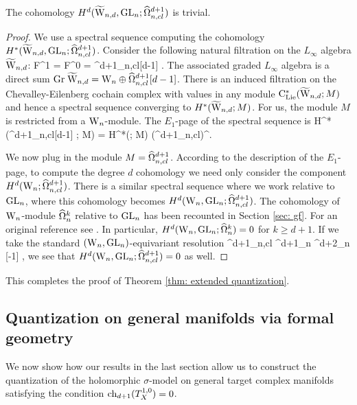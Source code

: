 \begin{lem}
The cohomology $H^{d}(\widetilde{\rm W}_{n,d} , {\rm GL}_n ; \widehat{\Omega}^{d+1}_{n,cl})$ is trivial.
\end{lem}
\begin{proof}
We use a spectral sequence computing the cohomology $H^{*}(\widetilde{\rm W}_{n,d} , {\rm GL}_n ; \widehat{\Omega}^{d+1}_{n,cl})$.
Consider the following natural filtration on the $L_\infty$ algebra $\widetilde{\rm W}_{n,d}$:
\ben
F^1 = \TVectd \supset F^0 = \hOmega^{d+1}_{n,cl}[d-1] .
\een
The associated graded $L_\infty$ algebra is a direct sum ${\rm Gr} \; \widetilde{\rm W}_{n,d} = {{\rm W}_n} \oplus \widehat{\Omega}^{d+1}_{n,cl}[d-1]$. 
There is an induced filtration on the Chevalley-Eilenberg cochain complex with values in any module ${\rm C}_{{\rm Lie}}^*(\widetilde{\rm W}_{n,d} ; M)$ and hence a spectral sequence converging to $H^*(\widetilde{\rm W}_{n,d} ; M)$. 
For us, the module $M$ is restricted from a ${{\rm W}_n}$-module. 
The $E_1$-page of the spectral sequence is 
\ben
H^*(\Vect \oplus \hOmega^{d+1}_{n,cl}[d-1] ; M) = H^*(\Vect ; M) \tensor \Sym \left(\hOmega^{d+1}_{n,cl}\right)^\vee [-d] .
\een

We now plug in the module $M = \widehat{\Omega}^{d+1}_{n,cl}$. 
According to the description of the $E_1$-page, to compute the degree $d$ cohomology we need only consider the component $H^d({{\rm W}_n} ; \widehat{\Omega}^{d+1}_{n,cl})$.
There is a similar spectral sequence where we work relative to ${\rm GL}_n$, where this cohomology becomes $H^d({{\rm W}_n} , {\rm GL}_n; \widehat{\Omega}^{d+1}_{n,cl})$.
The cohomology of ${{\rm W}_n}$-module $\widehat{\Omega}^{k}_n$ relative to ${\rm GL}_n$ has been recounted in Section \ref{sec: gf}.
For an original reference see \cite{Fuks}.
In particular, $H^{d}({{\rm W}_n}, {\rm GL}_n ; \widehat{\Omega}^{k}_n) = 0$ for $k \geq d+1$. 
If we take the standard $({{\rm W}_n} ,{\rm GL}_n)$-equivariant resolution
\ben
\hOmega^{d+1}_{n,cl} \simeq \hOmega^{d+1}_n \xto{\partial} \hOmega^{d+2}_n [-1] \xto{\partial} \cdots ,
\een
we see that $H^{d}({{\rm W}_n}, {\rm GL}_n ; \widehat{\Omega}^{d+1}_{n,cl}) = 0$ as well.

\end{proof}

This completes the proof of Theorem \ref{thm: extended quantization}.

\subsection{Quantization on general manifolds via formal geometry}

We now show how our results in the last section allow us to construct the quantization of the holomorphic $\sigma$-model on general target complex manifolds satisfying the condition ${\rm ch}_{d+1}(T_X^{1,0}) = 0$.

